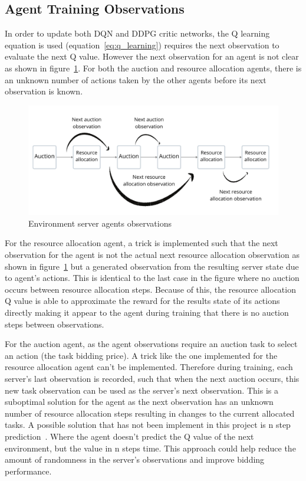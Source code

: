 \subsection{Agent Training Observations}\label{subsec:agent-training-observations}
In order to update both DQN and DDPG critic networks, the Q learning equation is used (equation~\eqref{eq:q_learning})
requires the next observation to evaluate the next Q value. However the next observation for an
agent is not clear as shown in figure~\ref{fig:environment-observations}. For both the auction and resource allocation
agents, there is an unknown number of actions taken by the other agents before its next observation is known.

\begin{figure}[h]
    \centering
    \includegraphics[width=14cm]{figures/4_implementation_figs/env_server_agents_observations.pdf}
    \caption{Environment server agents observations}
    \label{fig:environment-observations}
\end{figure}

For the resource allocation agent, a trick is implemented such that the next observation for the agent is not the
actual next resource allocation observation as shown in figure~\ref{fig:environment-observations} but a generated
observation from the resulting server state due to agent's actions. This is identical to the last case in the figure
where no auction occurs between resource allocation steps. Because of this, the resource allocation Q value is able to
approximate the reward for the results state of its actions directly making it appear to the agent during training that
there is no auction steps between observations.

For the auction agent, as the agent observations require an auction task to select an action (the task bidding price).
A trick like the one implemented for the resource allocation agent can't be implemented. Therefore during training,
each server's last observation is recorded, such that when the next auction occurs, this new task observation can be
used as the server's next observation. This is a suboptimal solution for the agent as the next observation
has an unknown number of resource allocation steps resulting in changes to the current allocated tasks.
A possible solution that has not been implement in this project is n step prediction~\citep{multi-step-dqn}. Where the
agent doesn't predict the Q value of the next environment, but the value in n steps time. This approach could help
reduce the amount of randomness in the server's observations and improve bidding performance.

